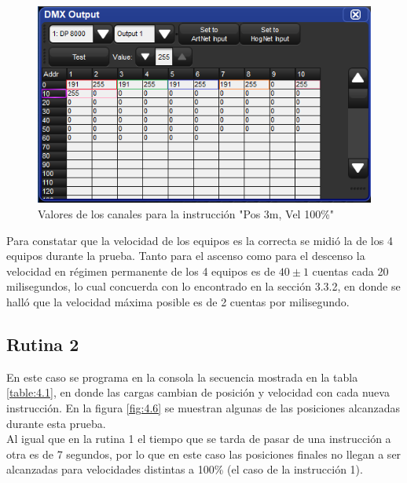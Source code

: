 \begin{figure}[!ht]
	\centering
	\includegraphics[width=16cm,scale=1]{resources/4_5-cuelist1_cue2.png}
	\caption{Valores de los canales para la instrucción "Pos 3m, Vel 100\%"}
	\label{fig:\thefigure}
\end{figure}

Para constatar que la velocidad de los equipos es la correcta se midió la de los 4 equipos durante la prueba. Tanto para el ascenso como para el descenso la velocidad en régimen permanente de los 4 equipos es de \(40 \pm 1\) cuentas cada 20 milisegundos, lo cual concuerda con lo encontrado en la sección 3.3.2, en donde se halló que la velocidad máxima posible es de 2 cuentas por milisegundo.

\subsection{Rutina 2}
En este caso se programa en la consola la secuencia mostrada en la tabla \ref{table:4.1}, en donde las cargas cambian de posición y velocidad con cada nueva instrucción. En la figura \ref{fig:4.6} se muestran algunas de las posiciones alcanzadas durante esta prueba. \\
Al igual que en la rutina 1 el tiempo que se tarda de pasar de una instrucción a otra es de 7 segundos, por lo que en este caso las posiciones finales no llegan a ser alcanzadas para velocidades distintas a 100\% (el caso de la instrucción 1).


